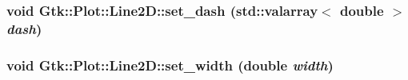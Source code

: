 \label{classGtk_1_1Plot_1_1Line2D_aeddda540e6d9c98d6495fdac8ceb7d3e}
\hypertarget{classGtk_1_1Plot_1_1Line2D_ac569c4747dacde24d6d0e2fb4d9a2011}{
\subsubsection[{set\_\-dash}]{\setlength{\rightskip}{0pt plus 5cm}void Gtk::Plot::Line2D::set\_\-dash (std::valarray$<$ double $>$ {\em dash})}}
\label{classGtk_1_1Plot_1_1Line2D_ac569c4747dacde24d6d0e2fb4d9a2011}
\hypertarget{classGtk_1_1Plot_1_1Line2D_aa304dd085c71f0f85477f1680f0cafea}{
\subsubsection[{set\_\-width}]{\setlength{\rightskip}{0pt plus 5cm}void Gtk::Plot::Line2D::set\_\-width (double {\em width})}}
\label{classGtk_1_1Plot_1_1Line2D_aa304dd085c71f0f85477f1680f0cafea}


